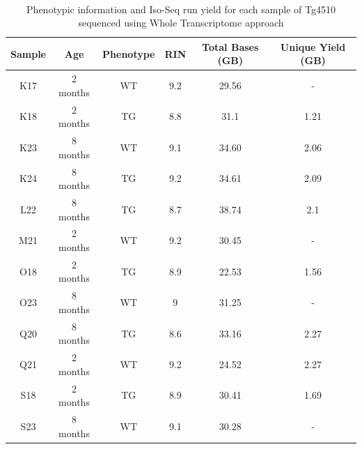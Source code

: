 \
\begin{table}[h]
	\begin{tabularx}{1\textwidth}{cccccc}
		\toprule
		Sample & Age      & Phenotype & RIN & Total Bases (GB) & Unique Yield (GB) \\ \midrule
		K17    & 2 months & WT   & 9.2 & 29.56            & -                           \\
		K18    & 2 months & TG   & 8.8 & 31.1             & 1.21                        \\
		K23    & 8 months & WT   & 9.1 & 34.60            & 2.06                        \\
		K24    & 8 months & TG   & 9.2 & 34.61            & 2.09                        \\
		L22    & 8 months & TG   & 8.7 & 38.74            & 2.1                         \\
		M21    & 2 months & WT   & 9.2 & 30.45            & -                           \\
		O18    & 2 months & TG   & 8.9 & 22.53            & 1.56                        \\
		O23    & 8 months & WT   & 9   & 31.25            & -                           \\
		Q20    & 8 months & TG   & 8.6 & 33.16            & 2.27                        \\
		Q21    & 2 months & WT   & 9.2 & 24.52            & 2.27                        \\
		S18    & 2 months & TG   & 8.9 & 30.41            & 1.69                        \\
		S23     & 8 months & WT   & 9.1 & 30.28            & -                          \\ \bottomrule
	\end{tabularx}
	\caption[Run Yield Output from Whole Transcriptome Iso-Seq of Tg4510]%
	{Phenotypic information and Iso-Seq run yield for each sample of Tg4510 sequenced using Whole Transcriptome approach}
	\label{tab:isoseq_wholerun_output}
\end{table}

